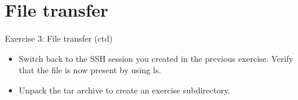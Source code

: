\documentclass{beamer}
\begin{document}
\section{File transfer}
\begin{frame}{Exercise 3: File transfer (ctd)}
\begin{itemize}
\item{Switch back to the SSH session you created in the previous exercise. Verify that the file is now present by using \alert{ls}.}
\item{Unpack the tar archive to create an exercise subdirectory.}
\end{itemize}
\end{frame}
    

\end{document}
